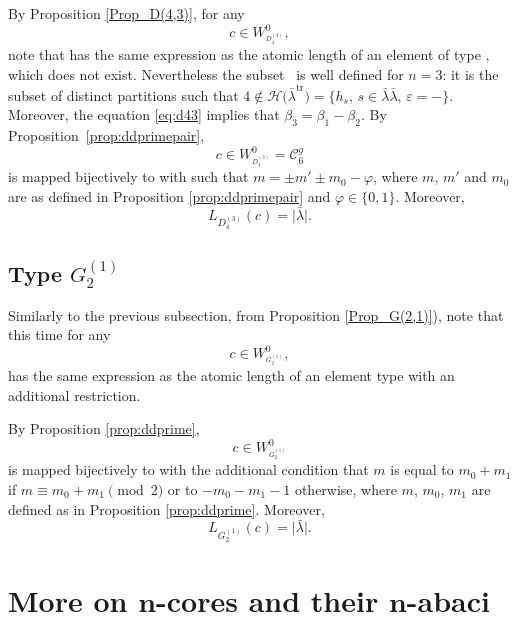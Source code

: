\documentclass[10pt,a4paper]{amsart}
\numberwithin{equation}{section}
\newcommand{\cC}{\mathcal{C}}
\def\cch{\mathcal H}
\begin{document}
By Proposition \ref{Prop_D(4,3)}, for any
\[
c\in W_{^{D_{4}^{(3)}}}^{0},
\]
 note that  has the same expression as the atom\-ic length of an element of type , which does not exist. Nevertheless the subset~\smash{$\cC_{2n-2}^{d,\mathrm{tr}}$}
is well defined for $n=3$: it is the subset of distinct partitions such that
$4\not\in \cch\bigl(\bar{\lambda}^{\mathrm{tr}}\bigr)=\{h_{s},\,{s\in \bar{\lambda}\bar{\lambda}},\,{\varepsilon =-}\}$.
	Moreover, the equation \eqref{eq:d43} implies that $\beta_3=\beta_1-\beta_2$.
	By Proposition~\ref{prop:ddprimepair},
\[
c\in W_{^{D_{4}^{(3)}}}^{0}=\mathcal{C}_{6}^{g}
\]
 is mapped bijectively to
	\smash{$\bar{\lambda}\in\cC_{4}^{d,\mathrm{tr}}$} with  such that $m=\pm m'\pm m_0-\varphi$, where $m$, $m'$ and $m_0$ are as defined in Proposition \ref{prop:ddprimepair} and $\varphi\in\lbrace 0,1\rbrace$. Moreover,
\begin{equation*}
L_{D_{4}^{(3)}}(c)=\bigl\lvert \bar{\lambda}\bigr\rvert.
\end{equation*}

\subsection[Type G\_2\^{}(1)]{Type $G_{2}^{(1)}$}

Similarly to the previous subsection, from Proposition \ref{Prop_G(2,1)}), note that this time for any
\[
c\in W_{^{G_{2}^{(1)}}}^{0},
\]
 has the same expression as the atomic length of an element type  with an additional restriction.

By Proposition \ref{prop:ddprime},
\[
c\in W_{^{G_{2}^{(1)}}}^{0}
\] is mapped bijectively to  with the additional condition that $m$ is equal to $m_0+m_1$ if $m\equiv m_0+m_1 \pmod{2}$ or to $-m_0-m_1-1$ otherwise, where $m$, $m_0$, $m_1$ are defined as in Proposition \ref{prop:ddprime}. Moreover,
\begin{equation*}
L_{G_{2}^{(1)}}(c)=\bigl\lvert \bar{\lambda}\bigr\rvert.
\end{equation*}


\section[More on n-cores and their n-abaci]{More on $\boldsymbol{n}$-cores and their $\boldsymbol{n}$-abaci}\label{sec:abacus}
\end{document}
